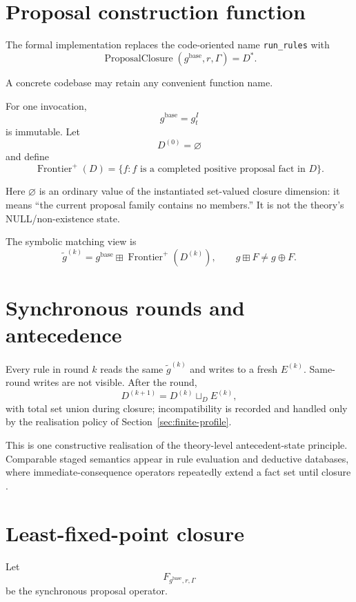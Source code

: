 \documentclass[11pt,a4paper]{article}
\theoremstyle{remark}
\begin{document}
\section{Proposal construction function}\label{sec:closure-function}

The formal implementation replaces the code-oriented name \texttt{run\_rules} with
\[
\boxed{
\operatorname{ProposalClosure}
(g^{\mathrm{base}},r,\Gamma)
=
D^*.
}
\]

A concrete codebase may retain any convenient function name.

For one invocation,
\[
g^{\mathrm{base}}=g_t^I
\]
is immutable. Let
\[
D^{(0)}=\varnothing
\]
and define
\[
\operatorname{Frontier}^+(D)
=
\{f:f\text{ is a completed positive proposal fact in }D\}.
\]

Here $\varnothing$ is an ordinary value of the instantiated set-valued closure dimension: it means ``the current proposal family contains no members.'' It is not the theory's NULL/non-existence state.

The symbolic matching view is
\[
\widetilde g^{(k)}
=
g^{\mathrm{base}}
\boxplus
\operatorname{Frontier}^+(D^{(k)}),
\qquad
g\boxplus F\neq g\oplus F.
\]

\section{Synchronous rounds and antecedence}\label{sec:rounds}

Every rule in round $k$ reads the same $\widetilde g^{(k)}$ and writes to a fresh $E^{(k)}$. Same-round writes are not visible. After the round,
\[
D^{(k+1)}
=
D^{(k)}\sqcup_D E^{(k)},
\]
with total set union during closure; incompatibility is recorded and handled only by the realisation policy of Section~\ref{sec:finite-profile}.

This is one constructive realisation of the theory-level antecedent-state principle. Comparable staged semantics appear in rule evaluation and deductive databases, where immediate-consequence operators repeatedly extend a fact set until closure \citep{ceri1989}.

\section{Least-fixed-point closure}\label{sec:lfp}

Let
\[
F_{g^{\mathrm{base}},r,\Gamma}
\]
be the synchronous proposal operator.
\end{document}
